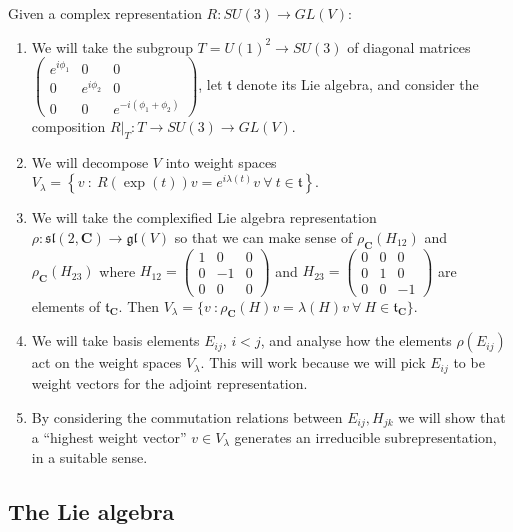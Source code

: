 \documentclass[12pt]{article}
\newcommand{\CC}{\mathbf{C}}
\newcommand{\Diag}[3]{\left(\begin{array}{ccc}#1 & 0 & 0\\0 & #2 & 0\\0 & 0 & #3\end{array}\right)}
\theoremstyle{definition}
\theoremstyle{check}
\theoremstyle{remark}
\theoremstyle{TheoremNum}
\begin{document}
Given a complex representation $R\colon SU(3)\to GL(V)$:
\begin{enumerate}
\item We will take the subgroup $T=U(1)^2\to SU(3)$ of diagonal matrices $\Diag{e^{i\phi_1}}{e^{i\phi_2}}{e^{-i(\phi_1+\phi_2)}}$, let $\mathfrak{t}$ denote its Lie algebra, and consider the composition $R|_T\colon T\to SU(3)\to GL(V)$.
\item We will decompose $V$ into weight spaces $V_{\lambda}=\left\{v\ :\ R(\exp(t))v=e^{i\lambda(t)}v\ \forall\ t\in\mathfrak{t}\right\}$.
\item We will take the complexified Lie algebra representation $\rho\colon\mathfrak{sl}(2,\CC)\to \mathfrak{gl}(V)$ so that we can make sense of $\rho_{\CC}(H_{12})$ and $\rho_{\CC}(H_{23})$ where $H_{12}=\Diag{1}{-1}{0}$ and $H_{23}=\Diag{0}{1}{-1}$ are elements of $\mathfrak{t}_{\CC}$. Then $V_{\lambda}=\{v\ :\rho_{\CC}(H)v=\lambda(H)v\ \forall\ H\in\mathfrak{t}_{\CC}\}$.
\item We will take basis elements $E_{ij}$, $i<j$, and analyse how the elements $\rho(E_{ij})$ act on the weight spaces $V_{\lambda}$. This will work because we will pick $E_{ij}$ to be weight vectors for the adjoint representation.
\item By considering the commutation relations between $E_{ij},H_{jk}$ we will show that a ``highest weight vector'' $v\in V_{\lambda}$ generates an irreducible subrepresentation, in a suitable sense.
\end{enumerate}

\subsection{The Lie algebra}
\end{document}
